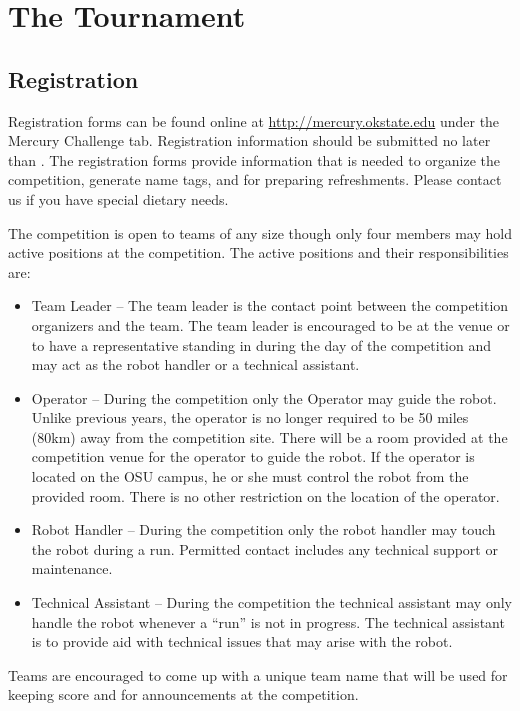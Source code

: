 \section{The Tournament}
\subsection{Registration}
Registration forms can be found online at \url{http://mercury.okstate.edu} under the Mercury Challenge tab. Registration information should be submitted no later than \textbf{\registration}. The registration forms provide information that is needed to organize the competition, generate name tags, and for preparing refreshments. Please contact us if you have special dietary needs.

The competition is open to teams of any size though only four members may hold active positions at the competition. The active positions and their responsibilities are:

\begin{itemize}
\item Team Leader – The team leader is the contact point between the competition organizers and the team. The team leader is encouraged to be at the venue or to have a representative standing in during the day of the competition and may act as the robot handler or a technical assistant.
\item Operator – During the competition only the Operator may guide the robot. Unlike previous years, the operator is no longer required to be 50 miles (80km) away from the competition site. There will be a room provided at the competition venue for the operator to guide the robot. If the operator is located on the OSU campus, he or she must control the robot from the provided room. There is no other restriction on the location of the operator.
\item Robot Handler – During the competition only the robot handler may touch the robot during a run. Permitted contact includes any technical support or maintenance.
\item Technical Assistant – During the competition the technical assistant may only handle the robot whenever a “run” is not in progress. The technical assistant is to provide aid with technical issues that may arise with the robot.
\end{itemize}

Teams are encouraged to come up with a unique team name that will be used for keeping score and for announcements at the competition. 

